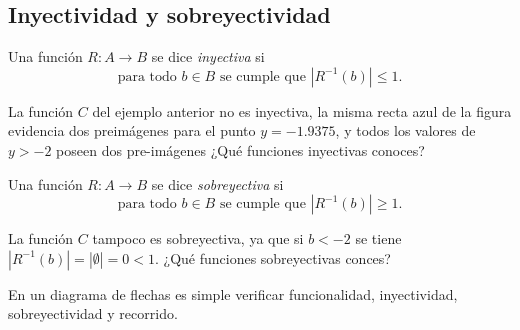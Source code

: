 \subsection{Inyectividad y sobreyectividad}

\begin{defn}
Una función  $R:A\rightarrow B$ se dice \emph{inyectiva} si 
$$\textrm{para todo } b\in B \textrm{ se cumple que }|R^{-1}(b)|\le 1.$$
\end{defn}

La función $C$ del ejemplo anterior no es inyectiva, la misma recta azul de la figura evidencia dos preimágenes para el punto $y=-1.9375$, y todos los valores de $y>-2$ poseen dos pre-imágenes  ¿Qué funciones inyectivas conoces?

\vspace{.2cm}


\begin{defn}
Una función  $R:A\rightarrow B$ se dice \emph{sobreyectiva} si 
$$\textrm{para todo } b\in B \textrm{ se cumple que }|R^{-1}(b)|\ge 1.$$
\end{defn}
La función $C$ tampoco es sobreyectiva, ya que si $b<-2$ se tiene $|R^{-1}(b)|=|\emptyset|=0<1$.
¿Qué funciones sobreyectivas conces?

\vspace{.2cm}




En un diagrama de flechas es simple verificar funcionalidad, inyectividad, sobreyectividad y recorrido.

\vspace{.2cm}



